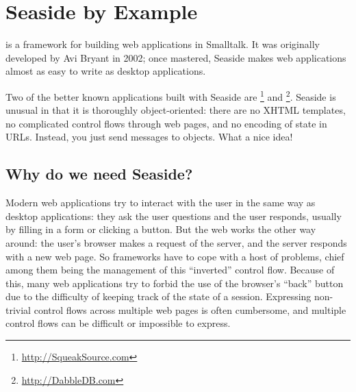 \documentclass[a4paper,10pt,twoside]{book}
\begin{document}
	\sloppy
\fi
\chapter{Seaside by Example}
\label{cha:seaside}


 is a framework for building web applications in Smalltalk.  It was originally developed by Avi Bryant  in 2002; once mastered, Seaside makes web applications almost as easy to write as desktop applications.

Two of the better known applications built with Seaside are \footnote{\url{http://SqueakSource.com}} and \footnote{\url{http://DabbleDB.com}}.
Seaside is unusual in that it is thoroughly object-oriented: there are no XHTML templates, no complicated control flows through web pages, and no encoding of state in URLs. Instead, you just send messages to objects.  What a nice idea!

\section{Why do we need Seaside?}

Modern web applications try to interact with the user in the same way as desktop applications: they ask the user questions and the user responds, usually by filling in a form or clicking a button.
But the web works the other way around: the user's browser makes a request of the server, and the server responds with a new web page.
So  frameworks have to cope with a host of problems, chief among them being the management of this ``inverted'' control flow. 
Because of this, many web applications try to forbid the use of the browser's ``back'' button due to the difficulty of keeping track of the state of a session. 
Expressing non-trivial control flows across multiple web pages is often cumbersome, and multiple control flows can be difficult or impossible to express.

\end{document}
